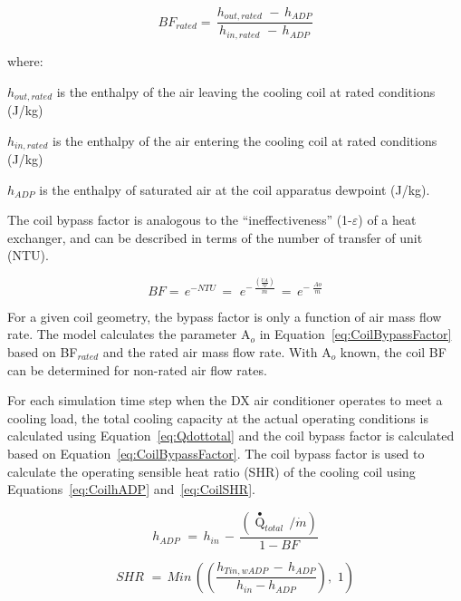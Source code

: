 \begin{equation}
B{F_{rated}} = \,\frac{{{h_{out,rated}}\,\, - \,{h_{ADP}}}}{{{h_{in,rated}}\,\, - \,{h_{ADP}}}}
\end{equation}

where:

\(h_{out,rated}\) is the enthalpy of the air leaving the cooling coil at rated conditions (J/kg)

\(h_{in,rated}\) is the enthalpy of the air entering the cooling coil at rated conditions (J/kg)

\(h_{ADP}\) is the enthalpy of saturated air at the coil apparatus dewpoint (J/kg).

The coil bypass factor is analogous to the ``ineffectiveness'' (1-\(\varepsilon\)) of a heat exchanger, and can be described in terms of the number of transfer of unit (NTU).

\begin{equation}
BF = \,{e^{ - NTU}}\, = \,\,{e^{ - \,{\frac{{\left( {\frac{{UA}}{{cp}}} \right)}}{\dot m}}}}\, = \,{e^{ - \,\,{\frac{{Ao}}{\dot m}}}}
\label{eq:CoilBypassFactor}
\end{equation}

For a given coil geometry, the bypass factor is only a function of air mass flow rate. The model calculates the parameter A\(_{o}\) in Equation~\ref{eq:CoilBypassFactor} based on BF\(_{rated}\) and the rated air mass flow rate. With A\(_{o}\) known, the coil BF can be determined for non-rated air flow rates.

For each simulation time step when the DX air conditioner operates to meet a cooling load, the total cooling capacity at the actual operating conditions is calculated using Equation~\ref{eq:Qdottotal} and the coil bypass factor is calculated based on Equation~\ref{eq:CoilBypassFactor}. The coil bypass factor is used to calculate the operating sensible heat ratio (SHR) of the cooling coil using Equations~\ref{eq:CoilhADP} and~\ref{eq:CoilSHR}.

\begin{equation}
{h_{ADP}}\,\, = \,{h_{in}}\, - \,\frac{{({{\mathop Q\limits^ \bullet  }_{total}}\,/\dot m)}}{{1 - BF}}
\label{eq:CoilhADP}
\end{equation}

\begin{equation}
SHR\,\, = \,Min\,\left( {\left( {\frac{{{h_{Tin,wADP}}\, - \,{h_{ADP}}}}{{{h_{in}} - {h_{ADP}}}}} \right),\,\,1} \right)
\label{eq:CoilSHR}
\end{equation}

